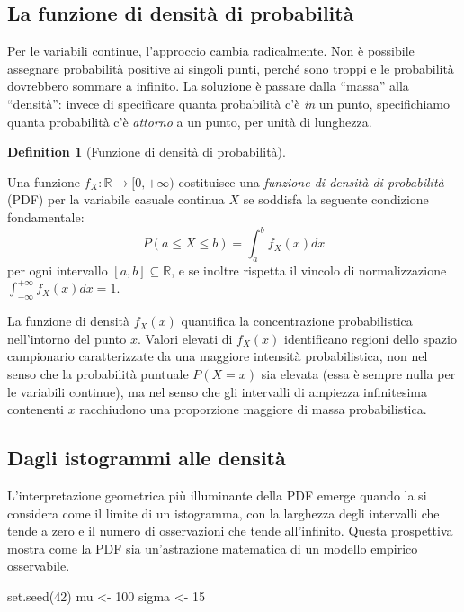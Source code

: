\documentclass[
  letterpaper,
  DIV=11,
  numbers=noendperiod,
  oneside]{scrreprt}
\newenvironment{Shaded}{\begin{snugshade}}{\end{snugshade}}
\newcommand{\DecValTok}[1]{\textcolor[rgb]{0.68,0.00,0.00}{#1}}
\newcommand{\FunctionTok}[1]{\textcolor[rgb]{0.28,0.35,0.67}{#1}}
\newcommand{\NormalTok}[1]{\textcolor[rgb]{0.00,0.23,0.31}{#1}}
\newcommand{\OtherTok}[1]{\textcolor[rgb]{0.00,0.23,0.31}{#1}}
\theoremstyle{definition}
\theoremstyle{plain}
\theoremstyle{definition}
\newtheorem{definition}{Definition}[chapter]
\theoremstyle{remark}
\begin{document}
\subsection{La funzione di densità di
probabilità}\label{la-funzione-di-densituxe0-di-probabilituxe0}

Per le variabili continue, l'approccio cambia radicalmente. Non è
possibile assegnare probabilità positive ai singoli punti, perché sono
troppi e le probabilità dovrebbero sommare a infinito. La soluzione è
passare dalla ``massa'' alla ``densità'': invece di specificare quanta
probabilità c'è \emph{in} un punto, specifichiamo quanta probabilità c'è
\emph{attorno} a un punto, per unità di lunghezza.

\begin{definition}[Funzione di densità di
probabilità]\protect\hypertarget{def-pdf}{}\label{def-pdf}

Una funzione \(f_X : \mathbb{R} \to [0, +\infty)\) costituisce una
\emph{funzione di densità di probabilità} (PDF) per la variabile casuale
continua \(X\) se soddisfa la seguente condizione fondamentale: \[
P(a \leq X \leq b) = \int_a^b f_X(x)  dx
\] per ogni intervallo \([a, b] \subseteq \mathbb{R}\), e se inoltre
rispetta il vincolo di normalizzazione
\(\int_{-\infty}^{+\infty} f_X(x)  dx = 1\).

La funzione di densità \(f_X(x)\) quantifica la concentrazione
probabilistica nell'intorno del punto \(x\). Valori elevati di
\(f_X(x)\) identificano regioni dello spazio campionario caratterizzate
da una maggiore intensità probabilistica, non nel senso che la
probabilità puntuale \(P(X = x)\) sia elevata (essa è sempre nulla per
le variabili continue), ma nel senso che gli intervalli di ampiezza
infinitesima contenenti \(x\) racchiudono una proporzione maggiore di
massa probabilistica.

\subsection{Dagli istogrammi alle
densità}\label{dagli-istogrammi-alle-densituxe0}

L'interpretazione geometrica più illuminante della PDF emerge quando la
si considera come il limite di un istogramma, con la larghezza degli
intervalli che tende a zero e il numero di osservazioni che tende
all'infinito. Questa prospettiva mostra come la PDF sia un'astrazione
matematica di un modello empirico osservabile.

\begin{Shaded}
\begin{Highlighting}[]
\FunctionTok{set.seed}\NormalTok{(}\DecValTok{42}\NormalTok{)}
\NormalTok{mu }\OtherTok{\textless{}{-}} \DecValTok{100}
\NormalTok{sigma }\OtherTok{\textless{}{-}} \DecValTok{15}


\end{Highlighting}
\end{Shaded}
\end{definition}
\end{document}
